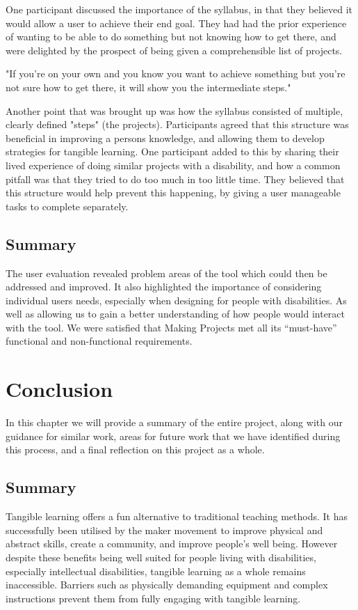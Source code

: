 \documentclass{l4proj}
\begin{document}
One participant discussed the importance of the syllabus, in that they believed it would allow a user to achieve their end goal. They had had the prior experience of wanting to be able to do something but not knowing how to get there, and were delighted by the prospect of being given a comprehensible list of projects. 

"If you're on your own and you know you want to achieve something but you're not sure how to get there, it will show you the intermediate steps."

Another point that was brought up was how the syllabus consisted of multiple, clearly defined "steps" (the projects). Participants agreed that this structure was beneficial in improving a persons knowledge, and allowing them to develop strategies for tangible learning. One participant added to this by sharing their lived experience of doing similar projects with a disability, and how a common pitfall was that they tried to do too much in too little time. They believed that this structure would help prevent this happening, by giving a user manageable tasks to complete separately. 

\section{Summary}
The user evaluation revealed problem areas of the tool which could then be addressed and improved. It also highlighted the importance of considering individual users needs, especially when designing for people with disabilities. As well as allowing us to gain a better understanding of how people would interact with the tool. We were satisfied that Making Projects met all its “must-have” functional and non-functional requirements.

\chapter{Conclusion}    
In this chapter we will provide a summary of the entire project, along with our guidance for similar work, areas for future work that we have identified during this process, and a final reflection on this project as a whole. 

\section{Summary}
Tangible learning offers a fun alternative to traditional teaching methods. It has successfully been utilised by the maker movement to improve physical and abstract skills, create a community, and improve people's well being. However despite these benefits being well suited for people living with disabilities, especially intellectual disabilities, tangible learning as a whole remains inaccessible. Barriers such as physically demanding equipment and complex instructions prevent them from fully engaging with tangible learning. 
\end{document}
